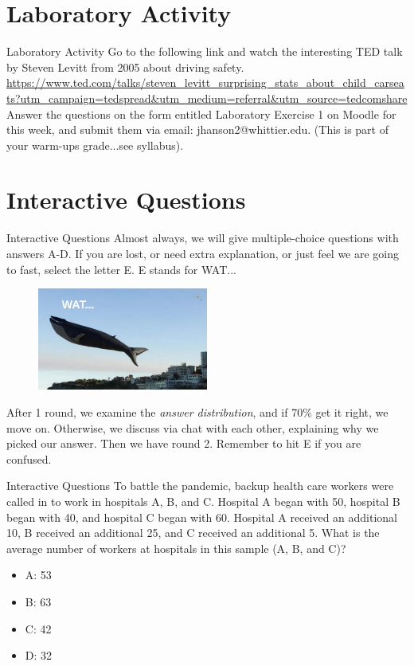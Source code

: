 \documentclass{beamer}
\begin{document}
\section{Laboratory Activity}

\begin{frame}{Laboratory Activity}
Go to the following link and watch the interesting TED talk by Steven Levitt from 2005 about driving safety. \\ \vspace{1cm}
\url{https://www.ted.com/talks/steven_levitt_surprising_stats_about_child_carseats?utm_campaign=tedspread&utm_medium=referral&utm_source=tedcomshare} \\ \vspace{1cm}
Answer the questions on the form entitled \alert{Laboratory Exercise 1} on Moodle for this week, and submit them via email: jhanson2@whittier.edu. (This is part of your warm-ups grade...see syllabus).
\end{frame}

\section{Interactive Questions}

\begin{frame}{Interactive Questions}
Almost always, we will give multiple-choice questions with answers A-D.  If you are lost, or need extra explanation, or just feel we are going to fast, select the letter E.  E stands for WAT...
\begin{figure}
\includegraphics[width=0.5\textwidth]{figures/wat.pdf}
\end{figure}
After 1 round, we examine the \textit{answer distribution}, and if 70\% get it right, we move on.  Otherwise, we discuss via chat with each other, explaining why we picked our answer.  Then we have round 2.  Remember to hit E if you are confused.
\end{frame}

\begin{frame}{Interactive Questions}
To battle the pandemic, backup health care workers were called in to work in hospitals A, B, and C.  Hospital A began with 50, hospital B began with 40, and hospital C began with 60.  Hospital A received an additional 10, B received an additional 25, and C received an additional 5.  What is the average number of workers at hospitals in this sample (A, B, and C)?
\begin{itemize}
\item A: 53
\item B: 63
\item C: 42
\item D: 32
\end{itemize}
\end{frame}
\end{document}
